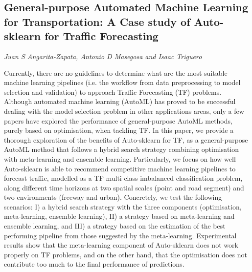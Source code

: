 \documentclass[../booklet.tex]{subfiles}
\begin{document}
\subsection[General-purpose Automated Machine Learning for Transportation: A Case study of Auto-sklearn for Traffic Forecasting. {\it Juan S Angarita-Zapata, Antonio D Masegosa and Isaac Triguero}]{General-purpose Automated Machine Learning for Transportation: A Case study of Auto-sklearn for Traffic Forecasting}
  

\begin{center}
  {\it Juan S Angarita-Zapata, Antonio D Masegosa and Isaac Triguero}
\end{center}



Currently, there are no guidelines to determine what are the most suitable machine learning pipelines (i.e. the workflow from data preprocessing to model selection and validation) to approach Traffic Forecasting (TF) problems. Although automated machine learning (AutoML) has proved to be successful dealing with the model selection problem in other applications areas, only a few papers have explored the performance of general-purpose AutoML methods, purely based on optimisation, when tackling TF. In this paper, we provide a thorough exploration of the benefits of Auto-sklearn for TF, as a general-purpose AutoML method that follows a hybrid search strategy combining optimisation with meta-learning and ensemble learning. Particularly, we focus on how well Auto-sklearn is able to recommend competitive machine learning pipelines to forecast traffic, modelled as a TF multi-class imbalanced classification problem, along different time horizons at two spatial scales (point and road segment) and two environments (freeway and urban). Concretely, we test the following scenarios: I) a hybrid search strategy with the three components (optimisation, meta-learning, ensemble learning), II) a strategy based on meta-learning and ensemble learning, and III) a strategy based on the estimation of the best performing pipeline from those suggested by the meta-learning. Experimental results show that the meta-learning component of Auto-sklearn does not work properly on TF problems, and on the other hand, that the optimisation does not contribute too much to the final performance of predictions.

\end{document}

